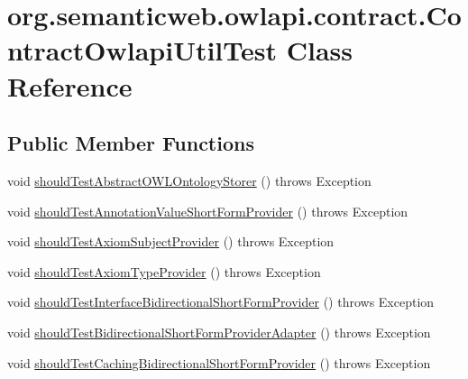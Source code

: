\hypertarget{classorg_1_1semanticweb_1_1owlapi_1_1contract_1_1_contract_owlapi_util_test}{\section{org.\-semanticweb.\-owlapi.\-contract.\-Contract\-Owlapi\-Util\-Test Class Reference}
\label{classorg_1_1semanticweb_1_1owlapi_1_1contract_1_1_contract_owlapi_util_test}
}
\subsection*{Public Member Functions}
\begin{DoxyCompactItemize}
\item 
void \hyperlink{classorg_1_1semanticweb_1_1owlapi_1_1contract_1_1_contract_owlapi_util_test_aaa13276cc7b790d9371b9818a680bdb5}{should\-Test\-Abstract\-O\-W\-L\-Ontology\-Storer} ()  throws Exception 
\item 
void \hyperlink{classorg_1_1semanticweb_1_1owlapi_1_1contract_1_1_contract_owlapi_util_test_aa60a40bc3f7bb2a7a9b328e2cdaff06e}{should\-Test\-Annotation\-Value\-Short\-Form\-Provider} ()  throws Exception 
\item 
void \hyperlink{classorg_1_1semanticweb_1_1owlapi_1_1contract_1_1_contract_owlapi_util_test_a2d66065ae02c4c7de520fc65ffa30e80}{should\-Test\-Axiom\-Subject\-Provider} ()  throws Exception 
\item 
void \hyperlink{classorg_1_1semanticweb_1_1owlapi_1_1contract_1_1_contract_owlapi_util_test_a79b0e4367870bdb98c62bb21ba486276}{should\-Test\-Axiom\-Type\-Provider} ()  throws Exception 
\item 
void \hyperlink{classorg_1_1semanticweb_1_1owlapi_1_1contract_1_1_contract_owlapi_util_test_a087e595256d6c9bd94672d9e50709f41}{should\-Test\-Interface\-Bidirectional\-Short\-Form\-Provider} ()  throws Exception 
\item 
void \hyperlink{classorg_1_1semanticweb_1_1owlapi_1_1contract_1_1_contract_owlapi_util_test_a1e3b0dafcfb06a22fae31477c38c08f9}{should\-Test\-Bidirectional\-Short\-Form\-Provider\-Adapter} ()  throws Exception 
\item 
void \hyperlink{classorg_1_1semanticweb_1_1owlapi_1_1contract_1_1_contract_owlapi_util_test_acee7185f295543fe6c84770c4251c70f}{should\-Test\-Caching\-Bidirectional\-Short\-Form\-Provider} ()  throws Exception 
\item 

\end{DoxyCompactItemize}
